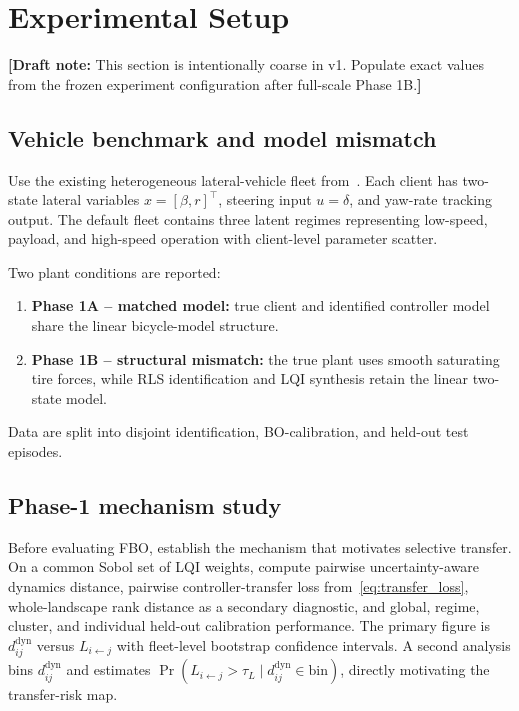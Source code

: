 \documentclass[conference]{IEEEtran}
\newcommand{\draftnote}[1]{\textcolor{blue!70!black}{\textbf{[Draft note:} #1\textbf{]}}}
\newcommand{\distdyn}{d^{\mathrm{dyn}}}
\begin{document}
\section{Experimental Setup}
\label{sec:experiments}
\draftnote{This section is intentionally coarse in v1. Populate exact values from the frozen experiment configuration after full-scale Phase 1B.}

\subsection{Vehicle benchmark and model mismatch}
Use the existing heterogeneous lateral-vehicle fleet from~\cite{weber2026ifac}. Each client has two-state lateral variables $x=[\beta,r]^\top$, steering input $u=\delta$, and yaw-rate tracking output. The default fleet contains three latent regimes representing low-speed, payload, and high-speed operation with client-level parameter scatter.

Two plant conditions are reported:
\begin{enumerate}
\item \textbf{Phase 1A -- matched model:} true client and identified controller model share the linear bicycle-model structure.
\item \textbf{Phase 1B -- structural mismatch:} the true plant uses smooth saturating tire forces, while RLS identification and LQI synthesis retain the linear two-state model.
\end{enumerate}
Data are split into disjoint identification, BO-calibration, and held-out test episodes.

\subsection{Phase-1 mechanism study}
Before evaluating FBO, establish the mechanism that motivates selective transfer. On a common Sobol set of LQI weights, compute pairwise uncertainty-aware dynamics distance, pairwise controller-transfer loss from~\eqref{eq:transfer_loss}, whole-landscape rank distance as a secondary diagnostic, and global, regime, cluster, and individual held-out calibration performance. The primary figure is $\distdyn_{ij}$ versus $L_{i\leftarrow j}$ with fleet-level bootstrap confidence intervals. A second analysis bins $\distdyn_{ij}$ and estimates $\Pr(L_{i\leftarrow j}>\tau_L\mid\distdyn_{ij}\in\text{bin})$, directly motivating the transfer-risk map.
\end{document}
